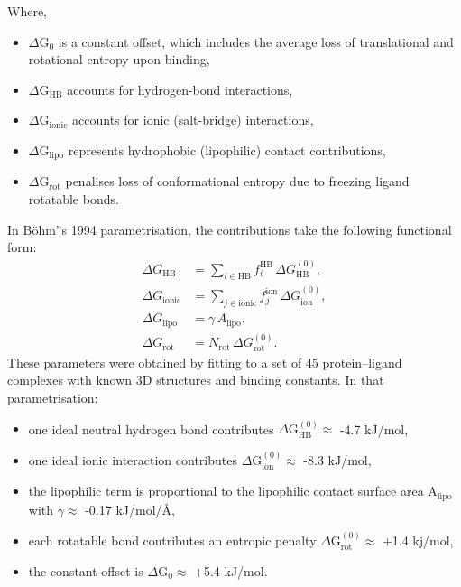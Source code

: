 \documentclass[12pt]{article}
\begin{document}
Where,
\begin{itemize}
  \item $\Delta \textrm{G}_0$ is a constant offset, which includes the average loss of translational and rotational entropy upon binding,
  \item $\Delta \textrm{G}_{\textrm{HB}}$ accounts for hydrogen-bond interactions,
  \item $\Delta \textrm{G}_{\textrm{ionic}}$ accounts for ionic (salt-bridge) interactions,
  \item $\Delta \textrm{G}_{\textrm{lipo}}$ represents hydrophobic (lipophilic) contact contributions,
  \item $\Delta \textrm{G}_{\textrm{rot}}$ penalises loss of conformational entropy due to freezing ligand rotatable bonds.
\end{itemize}

In B{\"o}hm''s 1994 parametrisation, the contributions take the following functional form:
\begin{equation}
\begin{aligned}
  \Delta G_{\text{HB}}
  &=
  \sum_{i \in \text{HB}}
  f_i^{\text{HB}} \,
  \Delta G_{\text{HB}}^{(0)},
  \\
  \Delta G_{\text{ionic}}
  &=
  \sum_{j \in \text{ionic}}
  f_j^{\text{ion}} \,
  \Delta G_{\text{ion}}^{(0)},
  \\
  \Delta G_{\text{lipo}}
  &=
  \gamma \,
  A_{\text{lipo}},
  \\
  \Delta G_{\text{rot}}
  &=
  N_{\text{rot}} \,
  \Delta G_{\text{rot}}^{(0)}.
\end{aligned}
  \label{eq:boehm}
\end{equation}
These parameters were obtained by fitting to a set of 45 protein--ligand complexes with known 3D structures and binding constants\cite{CH7_bohm1994}.  In that parametrisation:
\begin{itemize}
  \item one ideal neutral hydrogen bond contributes $\Delta \textrm{G}_{\textrm{HB}}^{(0)} \approx$ -4.7 kJ/mol,
  \item one ideal ionic interaction contributes $\Delta \textrm{G}_{\textrm{ion}}^{(0)} \approx$ -8.3 kJ/mol,
  \item the lipophilic term is proportional to the lipophilic contact surface area $\textrm{A}_{\textrm{lipo}}$ with $\gamma \approx$ -0.17 kJ/mol/\r{A},
  \item each rotatable bond contributes an entropic penalty $\Delta \text{G}_{\text{rot}}^{(0)} \approx$ +1.4 kj/mol,
  \item the constant offset is $\Delta \text{G}_0 \approx$ +5.4 kJ/mol.
\end{itemize}
\end{document}
